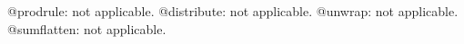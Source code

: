 \documentclass[11pt]{article}
\begin{document}
@prodrule: not applicable.
@distribute: not applicable.
@unwrap: not applicable.
@sumflatten: not applicable.
\end{document}
